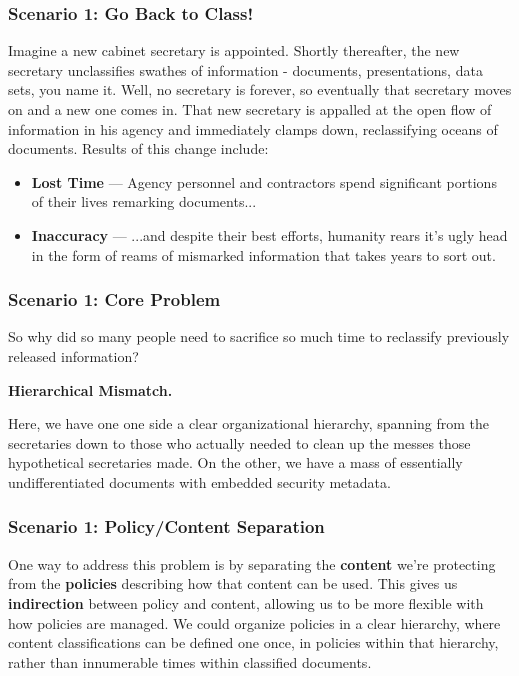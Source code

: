 \documentclass[t,handout, 10pt]{beamer}
\begin{document}
\begin{frame}
\frametitle{Scenario 1: Go Back to Class!}
Imagine a new cabinet secretary is appointed.  Shortly thereafter, the new secretary  unclassifies swathes of information - documents, presentations, data sets, you name it.  Well, no secretary is forever, so eventually that secretary moves on and a new one comes in.  That new secretary is appalled at the open flow of information in his agency and immediately clamps down, reclassifying oceans of documents.
\newline
\newline
Results of this change include:
\newline
\pause
\begin{itemize}
\item \textbf{Lost Time} --- Agency personnel and contractors spend significant portions of their lives remarking documents...
\pause
\item \textbf{Inaccuracy} --- ...and despite their best efforts, humanity rears it's ugly head in the form of reams of mismarked information that takes years to sort out.
\end{itemize}
\end{frame}

\begin{frame}
\frametitle{Scenario 1: Core Problem}
So why did so many people need to sacrifice so much time to reclassify previously released information?
\newline
\pause
\begin{center}
\textbf{Hierarchical Mismatch.}
\end{center}
\pause
Here, we have one one side a clear organizational hierarchy, spanning from the secretaries down to those who actually needed to clean up the messes those hypothetical secretaries made.  On the other, we have a mass of essentially undifferentiated documents with embedded security metadata.
\end{frame}

\begin{frame}
\frametitle{Scenario 1: Policy/Content Separation}
One way to address this problem is by separating the \textbf{content} we're protecting from the \textbf{policies} describing how that content can be used.
\pause
\newline
\newline
This gives us \textbf{indirection} between policy and content, allowing us to be more flexible with how policies are managed.
\pause
\newline
\newline
We could organize policies in a clear hierarchy, where content classifications can be defined one once, in policies within that hierarchy, rather than innumerable times within classified documents.
\end{frame}
\end{document}
